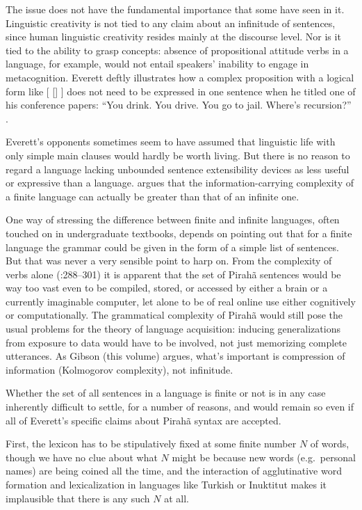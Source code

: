 \documentclass[output=paper,colorlinks,citecolor=brown
]{langscibook}
\begin{document}
The issue does not have the fundamental importance that some have seen
in it. Linguistic creativity is not tied to any claim about an infinitude
of sentences, since human linguistic creativity resides mainly at the
discourse level. Nor is it tied to the ability to grasp concepts:
absence of propositional attitude verbs in a language, for example,
would not entail speakers' inability to engage in metacognition.
Everett deftly illustrates how a complex proposition with a logical
form like [ [] ]  does not need
to be expressed in one sentence when he titled one of his conference
papers: ``You drink. You drive. You go to jail. Where's recursion?''
\citep{Everett10}.

Everett's opponents sometimes seem to have assumed that linguistic
life with only simple main clauses would hardly be worth living.
But there is no reason to regard a language lacking unbounded sentence
extensibility devices as less useful or expressive than a language.
\citet{Kornai14} argues that the information-carrying complexity of
a finite language can actually be greater than that of an infinite one.

One way of stressing the difference between finite and infinite languages,
often touched on in undergraduate textbooks, depends on pointing out that
for a finite language the grammar could be given in the form of a simple
list of sentences. But that was never a very sensible point to harp on.
From the complexity of verbs alone (\citealt{Everett86HAL}:288--301)
it is apparent that the set of Pirah{\~a} sentences would be way too vast
even to be compiled, stored, or accessed by either a brain or a currently
imaginable computer, let alone to be of real online use either cognitively
or computationally. The grammatical complexity of Pirah{\~a} would still
pose the usual problems for the theory of language acquisition: inducing
generalizations from exposure to data would have to be involved, not just
memorizing complete utterances. As Gibson (this volume) argues, what's
important is compression of information (Kolmogorov complexity), not
infinitude.

Whether the set of all sentences in a language is finite or not is
in any case inherently difficult to settle, for a number of reasons,
and would remain so even if all of Everett's specific claims about
Pirah{\~a} syntax are accepted.

First, the lexicon has to be stipulatively fixed at some finite number
$N$ of words, though we have no clue about what $N$ might be because
new words (e.g.\ personal names) are being coined all the time, and
the interaction of agglutinative word formation and lexicalization
in languages like Turkish or Inuktitut makes it implausible that there
is any such $N$ at all.
\end{document}
